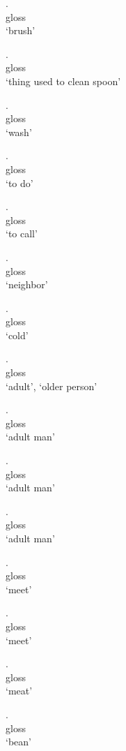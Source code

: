 \documentclass{assets/fieldnotes}
\begin{document}
\exg.  \\
gloss \\
`brush'

\exg.  \\
gloss \\
`thing used to clean spoon'

\exg.  \\
gloss \\
`wash'

\exg.  \\
gloss \\
`to do'

\exg.  \\
gloss \\
`to call'

\exg.  \\
gloss \\
`neighbor'

\exg.  \\
gloss \\
`cold'

\exg.  \\
gloss \\
`adult', `older person'

\exg.  \\
gloss \\
`adult man'

\exg.  \\
gloss \\
`adult man'

\exg.  \\
gloss \\
`adult man'

\exg.  \\
gloss \\
`meet'

\exg.  \\
gloss \\
`meet'

\exg.  \\
gloss \\
`meat'

\exg.  \\
gloss \\
`bean'
\end{document}

